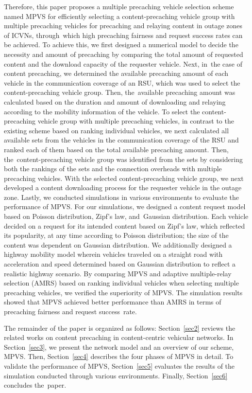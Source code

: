 \documentclass[sensors,aricle,accept,pdftex,moreauthors]{Definitions/mdpi}
\begin{document}
Therefore, this paper proposes a multiple precaching vehicle selection scheme named MPVS for efficiently selecting a content-precaching vehicle group with multiple precaching vehicles for precaching and relaying content in outage zones of ICVNs, through~which high precaching fairness and request success rates can be achieved.
To achieve this, we first designed a numerical model to decide the necessity and amount of precaching by comparing the total amount of requested content and the download capacity of the requester vehicle.
Next, in~the case of content precaching, we determined the available precaching amount of each vehicle in the communication coverage of an RSU, which was used to select the content-precaching vehicle group.
Then, the~available precaching amount was calculated based on the duration and amount of downloading and relaying according to the mobility information of the vehicle. 
To select the content-precaching vehicle group with multiple precaching vehicles, in contrast to the existing scheme based on ranking individual vehicles, we next calculated all available sets from the vehicles in the communication coverage of the RSU and ranked each of them based on the total available precaching amount.
Then, the~content-precaching vehicle group was identified from the sets by considering both the rankings of the sets and the connection overheads with multiple precaching vehicles.
With the selected content-precaching vehicle group, we next developed a content downloading process for the requester vehicle in the outage zone.
Lastly, we conducted simulations in various environments to evaluate the performance of MPVS.
For our simulations, we designed a content request model based on Poisson distribution, Zipf's law, and~Gaussian distribution. Each vehicle decided on a request for its intended content based on Zipf's law, which reflected its popularity, at any time according to Poisson distribution; the size of the content was dependent on Gaussian distribution.
We additionally designed a highway mobility model wherein vehicles traveled on a straight road with acceleration and speed determined based on Gaussian distribution to reflect a realistic highway scenario.
By comparing MPVS and adaptive multiple-relay selection (AMRS) \cite{Ahmed2018} based on ranking individual vehicles when selecting multiple precaching vehicles, we verified the superiority of MPVS. 
The simulation results showed that MPVS achieved better performance than AMRS in terms of precaching fairness and request success~rate.

The remainder of the paper is organized as follows:
Section~\ref{sec2} reviews the related works on content precaching in {content-centric vehicular networks}.
In Section~\ref{sec3}, we present the network model and an overview of our scheme, MPVS.
Then, Section~\ref{sec4} describes the four phases of MPVS in detail.
To validate the performance of MPVS, Section~\ref{sec5} evaluates the results of the simulation conducted through various environments.
Finally, Section~\ref{sec6} concludes the~paper.
\end{document}
